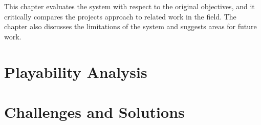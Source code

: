 \label{chapter:evaluation}

This chapter evaluates the system with respect to the original objectives, and it critically compares the projects approach to related work in the field. The chapter also discusses the limitations of the system and suggests areas for future work.

\section{Playability Analysis}






\section{Challenges and Solutions}

